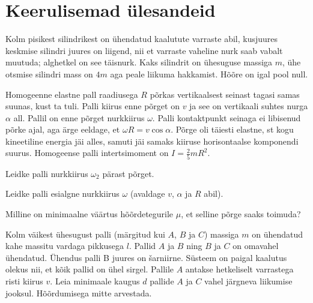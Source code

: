 \documentclass[a4paper,11pt,twocolumn]{article}
\begin{document}
\section{Keerulisemad ülesandeid}
\begin{question}[dun6][7cm]
	Kolm pisikest silindrikest on ühendatud kaalutute varraste abil, kusjuures keskmise silindri juures on liigend, nii et varraste vaheline nurk saab vabalt muutuda; alghetkel on see täisnurk. Kaks silindrit on ühesuguse massiga $ m $, ühe otsmise silindri mass on $ 4m $ aga peale liikuma hakkamist. Hõõre on igal pool null.
\end{question}
\begin{question}[E-S 2015, P7]
	Homogeenne elastne pall raadiusega $ R $ põrkas vertikaalsest seinast tagasi samas suunas, kust ta tuli. Palli kiirus enne põrget on $ v $ ja see on vertikaali suhtes nurga $ \alpha $ all. Pallil on enne põrget nurkkiirus $ \omega $. Palli kontaktpunkt seinaga ei libisenud põrke ajal, aga ärge eeldage, et $ \omega R = v \cos \alpha $. Põrge oli täiesti elastne, st kogu kineetiline energia jäi alles, samuti jäi samaks kiiruse horisontaalse komponendi suurus. Homogeense palli intertsimoment on $ I = \frac{2}{5} mR^2 $. 
	\begin{subquestion}
		\item Leidke palli nurkkiirus $ \omega_2 $ pärast põrget.
		\item Leidke palli esialgne nurkkiirus $ \omega $ (avaldage $ v $, $ \alpha $ ja $ R $ abil).
		\item Milline on minimaalne väärtus hõõrdetegurile $ \mu $, et selline põrge saaks toimuda?
	\end{subquestion} 
\end{question}
\begin{question}[EuPhO 2018, T1]
	Kolm väikest ühesugust palli (märgitud kui $ A $, $ B $ ja $ C $) massiga $ m $ on ühendatud kahe massitu vardaga pikkusega $ l $. Pallid $ A $ ja $ B $ ning $ B $ ja $ C $ on omavahel ühendatud. Ühendus palli B juures on šarniirne. Süsteem on paigal kaalutus olekus nii, et kõik pallid on ühel sirgel. Pallile $ A $ antakse hetkeliselt varrastega risti kiirus $ v $. Leia minimaale kaugus $ d $ pallide $ A $ ja $ C $ vahel järgneva liikumise jooksul. Hõõrdumisega mitte arvestada.
\end{question}
\end{document}
